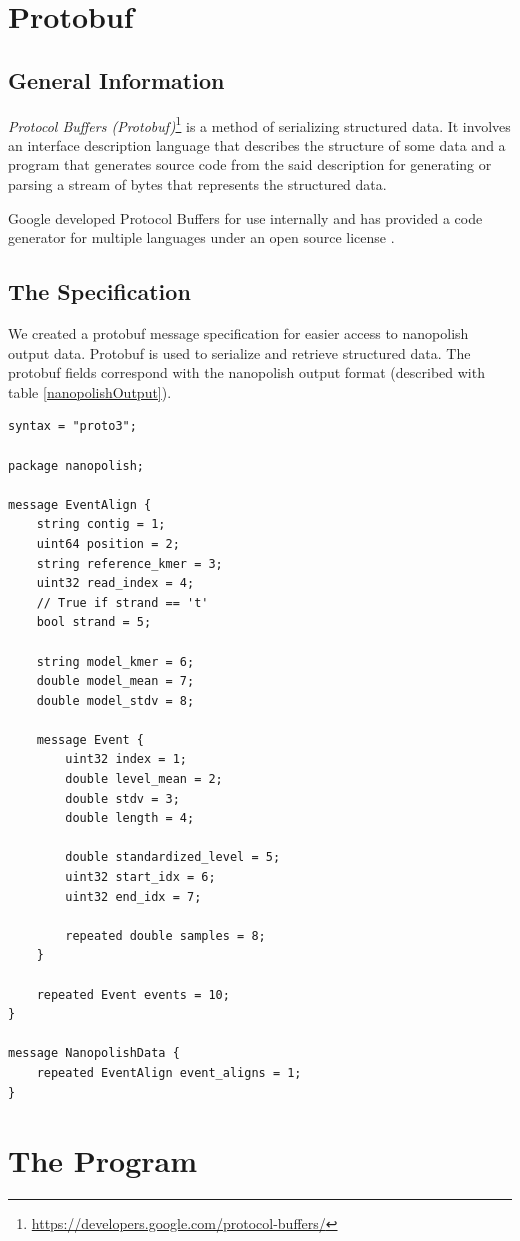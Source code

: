 \documentclass[times, utf, seminar]{fer}
\begin{document}
\chapter{Protobuf}
\section{General Information}
\textit{Protocol Buffers (Protobuf)}\footnote{\url{https://developers.google.com/protocol-buffers/}} is a method of serializing structured data. It involves an interface description language that describes the structure of some data and a program that generates source code from the said description for generating or parsing a stream of bytes that represents the structured data.

Google developed Protocol Buffers for use internally and has provided a code generator for multiple languages under an open source license \citep{protobuf}.
\section{The Specification}
We created a protobuf message specification for easier access to nanopolish 
output data. Protobuf is used to serialize and retrieve structured data.
The protobuf fields correspond with the nanopolish output format (described with table \ref{nanopolishOutput}). 

\begin{lstlisting}
syntax = "proto3";

package nanopolish;

message EventAlign {
	string contig = 1;
	uint64 position = 2;
	string reference_kmer = 3;
	uint32 read_index = 4;
	// True if strand == 't'
	bool strand = 5;

	string model_kmer = 6;
	double model_mean = 7;
	double model_stdv = 8;

	message Event {
		uint32 index = 1;
		double level_mean = 2;
		double stdv = 3;
		double length = 4;

		double standardized_level = 5;
		uint32 start_idx = 6;
		uint32 end_idx = 7;

		repeated double samples = 8;
	}

	repeated Event events = 10;
}

message NanopolishData {
	repeated EventAlign event_aligns = 1;
}
\end{lstlisting}


\chapter{The Program}
\end{document}
